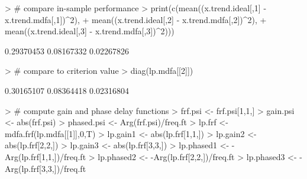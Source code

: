 \documentclass[a4paper]{book}
\begin{document}
\begin{Schunk}
\begin{Sinput}
> # compare in-sample performance
> print(c(mean((x.trend.ideal[,1] - x.trend.mdfa[,1])^2),
+ 	mean((x.trend.ideal[,2] - x.trend.mdfa[,2])^2),
+ 	mean((x.trend.ideal[,3] - x.trend.mdfa[,3])^2)))
\end{Sinput}
\begin{Soutput}
[1] 0.29370453 0.08167332 0.02267826
\end{Soutput}
\begin{Sinput}
> # compare to criterion value
> diag(lp.mdfa[[2]])
\end{Sinput}
\begin{Soutput}
[1] 0.30165107 0.08364418 0.02316804
\end{Soutput}
\begin{Sinput}
> # compute gain and phase delay functions
> frf.psi <- frf.psi[1,1,]
> gain.psi <- abs(frf.psi)
> phased.psi <- Arg(frf.psi)/freq.ft
> lp.frf <- mdfa.frf(lp.mdfa[[1]],0,T)
> lp.gain1 <- abs(lp.frf[1,1,])
> lp.gain2 <- abs(lp.frf[2,2,])
> lp.gain3 <- abs(lp.frf[3,3,])
> lp.phased1 <- -Arg(lp.frf[1,1,])/freq.ft
> lp.phased2 <- -Arg(lp.frf[2,2,])/freq.ft
> lp.phased3 <- -Arg(lp.frf[3,3,])/freq.ft
\end{Sinput}
\end{Schunk}
\end{document}
